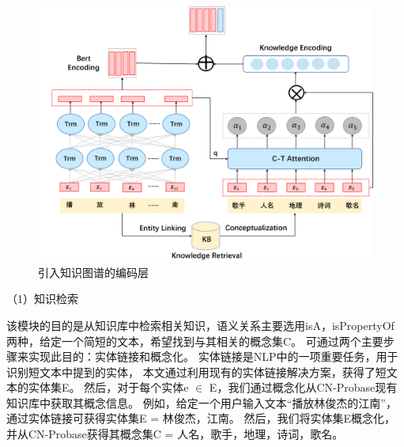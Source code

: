 



\begin{figure}[htbp]
  \centering
  \includegraphics[width=16cm]{./images/kg.png}
  \caption{引入知识图谱的编码层}
  \label{fig:kg}
\end{figure}
（1）知识检索

该模块的目的是从知识库中检索相关知识，语义关系主要选用isA，isPropertyOf两种，给定一个简短的文本，希望找到与其相关的概念集C。
可通过两个主要步骤来实现此目的：实体链接和概念化。
实体链接是NLP中的一项重要任务，用于识别短文本中提到的实体\cite{moro2014entity}，
本文通过利用现有的实体链接解决方案，获得了短文本的实体集E\cite{chen2018short}。
然后，对于每个实体e $\in$ E，我们通过概念化从CN-Probase现有知识库中获取其概念信息。
例如，给定一个用户输入文本“播放林俊杰的江南”，通过实体链接可获得实体集E = {林俊杰，江南}。
然后，我们将实体集E概念化，并从CN-Probase获得其概念集C = {人名，歌手，地理，诗词，歌名}。

